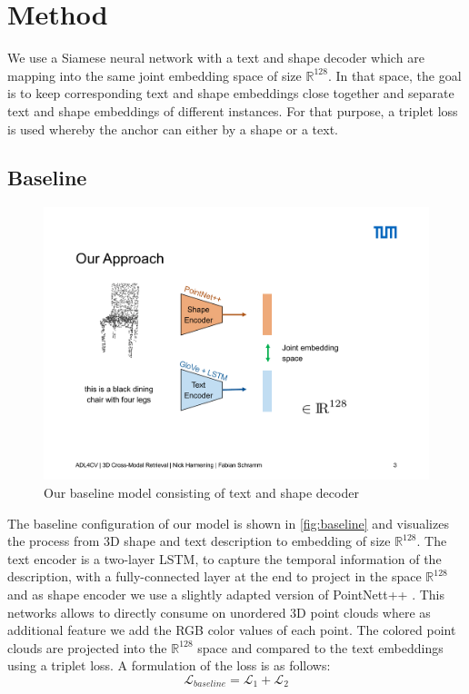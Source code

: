 \documentclass[10pt,twocolumn,letterpaper]{article}
\begin{document}
\section{Method}
We use a Siamese neural network with a text and shape decoder which are mapping into the same joint embedding space of size $\mathbb{R}^{128}$. In that space, the goal is to keep corresponding text and shape embeddings close together and separate text and shape embeddings of different instances. For that purpose, a triplet loss is used whereby the anchor can either by a shape or a text. 
\subsection{Baseline}
\begin{figure}[t]%
	\centering
	\includegraphics[width=0.8\linewidth]{fig3.pdf}
	\caption[]{Our baseline model consisting of text and shape decoder}
	\label{fig:baseline}
\end{figure}
The baseline configuration of our model is shown in \autoref{fig:baseline} and visualizes the process from 3D shape and text description to embedding of size $\mathbb{R}^{128}$. The text encoder is a two-layer LSTM, to capture the temporal information of the description, with a fully-connected layer at the end to project in the space $\mathbb{R}^{128}$ and as shape encoder we use a slightly adapted version of PointNett++ \cite{qi2017Pointnet++}. This networks allows to directly consume on unordered 3D point clouds where as additional feature we add the RGB color values of each point. The colored point clouds are projected into the $\mathbb{R}^{128}$ space and compared to the text embeddings using a triplet loss. A formulation of the loss is as follows:
\begin{equation}
\label{eqn:1}
\mathcal{L}_{baseline} = \mathcal{L}_{1} + \mathcal{L}_{2}
\end{equation}
\end{document}
